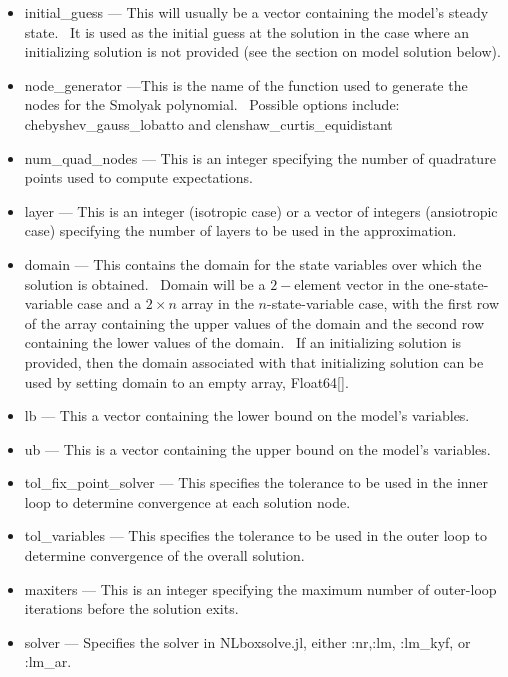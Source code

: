 \documentclass[notitlepage,11pt]{article}
\begin{document}
\begin{itemize}
\item initial\_guess --- This will usually be a vector containing the
model's steady state. \ It is used as the initial guess at the solution in
the case where an initializing solution is not provided (see the section on
model solution below).

\item node\_generator ---This is the name of the function used to generate
the nodes for the Smolyak polynomial. \ Possible options include:
chebyshev\_gauss\_lobatto and clenshaw\_curtis\_equidistant

\item num\_quad\_nodes --- This is an integer specifying the number of
quadrature points used to compute expectations.

\item layer --- This is an integer (isotropic case) or a vector of integers
(ansiotropic case) specifying the number of layers to be used in the
approximation.

\item domain --- This contains the domain for the state variables over which
the solution is obtained. \ Domain will be a $2-$element vector in the
one-state-variable case and a $2\times n$ array in the $n$-state-variable
case, with the first row of the array containing the upper values of the
domain and the second row containing the lower values of the domain. \ If an
initializing solution is provided, then the domain associated with that
initializing solution can be used by setting domain to an empty array,
Float64[].

\item lb --- This a vector containing the lower bound on the model's
variables.

\item ub --- This is a vector containing the upper bound on the model's
variables.

\item tol\_fix\_point\_solver --- This specifies the tolerance to be used in
the inner loop to determine convergence at each solution node.

\item tol\_variables --- This specifies the tolerance to be used in the
outer loop to determine convergence of the overall solution.

\item maxiters --- This is an integer specifying the maximum number of
outer-loop iterations before the solution exits.

\item solver --- Specifies the solver in NLboxsolve.jl, either :nr,:lm,
:lm\_kyf, or :lm\_ar.
\end{itemize}
\end{document}
